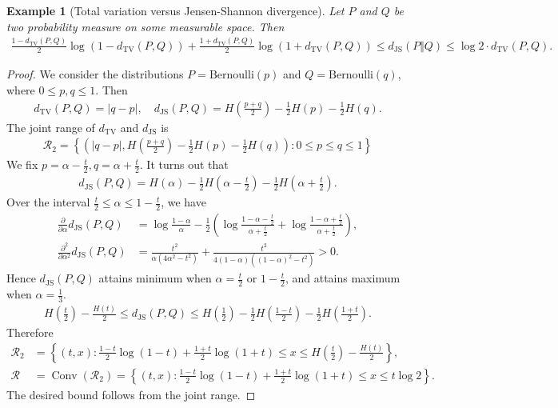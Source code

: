 \documentclass{article}
\numberwithin{equation}{section}
\renewcommand{\cal}{\mathcal}
\DeclareMathOperator{\conv}{Conv}
\theoremstyle{plain}
\newtheorem{example}[theorem]{Example}
\theoremstyle{definition}
\begin{document}
\begin{example}[Total variation versus Jensen-Shannon divergence]
	Let $P$ and $Q$ be two probability measure on some measurable space. Then
	\begin{align*}
		\frac{1-d_\mathrm{TV}(P,Q)}{2}\log\left(1-d_\mathrm{TV}(P,Q)\right)+\frac{1+d_\mathrm{TV}(P,Q)}{2}\log(1+d_\mathrm{TV}(P,Q))\leq d_\mathrm{JS}(P\Vert Q)\leq \log 2\cdot d_\mathrm{TV}(P,Q).
	\end{align*}
\end{example}
\begin{proof}
	We consider the distributions $P=\mathrm{Bernoulli}(p)$ and $Q=\mathrm{Bernoulli}(q)$, where $0\leq p,q\leq 1$. Then
	\begin{align*}
		d_\mathrm{TV}(P,Q)=\vert q-p\vert,\quad d_\mathrm{JS}(P,Q)=H\left(\frac{p+q}{2}\right)-\frac{1}{2}H(p)-\frac{1}{2}H(q).
	\end{align*} 
	The joint range of $d_{\mathrm{TV}}$ and $d_\mathrm{JS}$ is
	\begin{align*}
		\cal{R}_2=\left\{\left(\vert q-p\vert,H\left(\frac{p+q}{2}\right)-\frac{1}{2}H(p)-\frac{1}{2}H(q)\right):0\leq p\leq q\leq 1\right\}
	\end{align*}
	We fix $p=\alpha-\frac{t}{2},q=\alpha+\frac{t}{2}$. It turns out that
	\begin{align*}
		d_\mathrm{JS}(P,Q)=H(\alpha)-\frac{1}{2}H\left(\alpha-\frac{t}{2}\right)-\frac{1}{2}H\left(\alpha+\frac{t}{2}\right).
	\end{align*}
	Over the interval $\frac{t}{2}\leq \alpha\leq 1-\frac{t}{2}$, we have
	\begin{align*}
		\frac{\partial}{\partial\alpha}d_\mathrm{JS}(P,Q)&=\log\frac{1-\alpha}{\alpha}-\frac{1}{2}\left(\log\frac{1-\alpha-\frac{t}{2}}{\alpha+\frac{t}{2}}+\log\frac{1-\alpha+\frac{t}{2}}{\alpha+\frac{t}{2}}\right),\\
		\frac{\partial^2}{\partial\alpha^2}d_\mathrm{JS}(P,Q)&=\frac{t^2}{\alpha(4\alpha^2-t^2)}+\frac{t^2}{4(1-\alpha)((1-\alpha)^2-t^2)}>0.
	\end{align*}
	Hence $d_\mathrm{JS}(P,Q)$ attains minimum when $\alpha=\frac{t}{2}$ or $1-\frac{t}{2}$, and attains maximum when $\alpha=\frac{1}{3}$.
	\begin{align*}
		H\left(\frac{t}{2}\right)-\frac{H(t)}{2}\leq d_\mathrm{JS}(P,Q)\leq H\left(\frac{1}{2}\right)-\frac{1}{2}H\left(\frac{1-t}{2}\right)-\frac{1}{2}H\left(\frac{1+t}{2}\right).
	\end{align*}
	Therefore
	\begin{align*}
		\cal{R}_2&=\left\{(t,x):\frac{1-t}{2}\log(1-t)+\frac{1+t}{2}\log(1+t)\leq x\leq H\left(\frac{t}{2}\right)-\frac{H(t)}{2}  \right\},\\
		\cal{R}&=\conv(\cal{R}_2)=\left\{(t,x):\frac{1-t}{2}\log(1-t)+\frac{1+t}{2}\log(1+t)\leq x\leq t\log 2 \right\}.
	\end{align*}
The desired bound follows from the joint range.
\end{proof}
\end{document}
